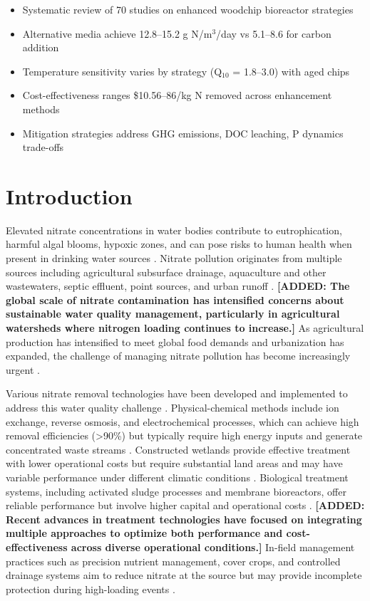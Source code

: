 \documentclass[12pt,a4paper]{article}
\newcommand{\added}[1]{\textcolor{addedtext}{\textbf{[ADDED: #1]}}}
\begin{document}
\begin{itemize}[leftmargin=*, itemsep=0.2em]
\item Systematic review of 70 studies on enhanced woodchip bioreactor strategies
\item Alternative media achieve 12.8--15.2 g N/m$^3$/day vs 5.1--8.6 for carbon addition
\item Temperature sensitivity varies by strategy (Q$_{10}$ = 1.8--3.0) with aged chips
\item Cost-effectiveness ranges \$10.56--86/kg N removed across enhancement methods
\item Mitigation strategies address GHG emissions, DOC leaching, P dynamics trade-offs
\end{itemize}

\section{Introduction}

Elevated nitrate concentrations in water bodies contribute to eutrophication, harmful algal blooms, hypoxic zones, and can pose risks to human health when present in drinking water sources \citep{RN1181}. Nitrate pollution originates from multiple sources including agricultural subsurface drainage, aquaculture and other wastewaters, septic effluent, point sources, and urban runoff \citep{RN1181, RN310}. \added{The global scale of nitrate contamination has intensified concerns about sustainable water quality management, particularly in agricultural watersheds where nitrogen loading continues to increase.} As agricultural production has intensified to meet global food demands and urbanization has expanded, the challenge of managing nitrate pollution has become increasingly urgent \citep{RN312}.

Various nitrate removal technologies have been developed and implemented to address this water quality challenge \citep{RN625, RN826}. Physical-chemical methods include ion exchange, reverse osmosis, and electrochemical processes, which can achieve high removal efficiencies (>90\%) but typically require high energy inputs and generate concentrated waste streams \citep{RN625}. Constructed wetlands provide effective treatment with lower operational costs but require substantial land areas and may have variable performance under different climatic conditions \citep{RN826}. Biological treatment systems, including activated sludge processes and membrane bioreactors, offer reliable performance but involve higher capital and operational costs \citep{RN625}. \added{Recent advances in treatment technologies have focused on integrating multiple approaches to optimize both performance and cost-effectiveness across diverse operational conditions.} In-field management practices such as precision nutrient management, cover crops, and controlled drainage systems aim to reduce nitrate at the source but may provide incomplete protection during high-loading events \citep{RN826}.
\end{document}
